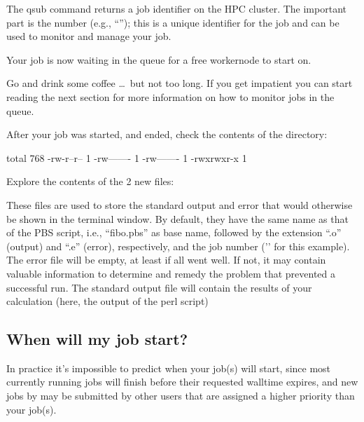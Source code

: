 \begin{prompt}
\end{prompt}

The qsub command returns a job identifier on the HPC cluster. The important
part is the number (e.g., ``\jobnumber''); this is a unique identifier for the job
and can be used to monitor and manage your job.

Your job is now waiting in the queue for a free workernode to start on.

Go and drink some coffee \dots\ but not too long. If you get impatient you can
start reading the next section for more information on how to monitor jobs in the queue.

After your job was started, and ended, check the contents of the directory:

\begin{prompt}
total 768
-rw-r--r-- 1 %
-rw------- 1 %
-rw------- 1 %
-rwxrwxr-x 1 %
\end{prompt}

Explore the contents of the 2 new files:

\begin{prompt}
\end{prompt}

These files are used to store the standard output and error that would
otherwise be shown in the terminal window. By default, they have the same name
as that of the PBS script, i.e., ``fibo.pbs'' as base name, followed by the
extension ``.o'' (output) and ``.e'' (error), respectively, and the job number
('\jobnumber' for this example). The error file will be empty, at least if all went
well. If not, it may contain valuable information to determine and remedy the
problem that prevented a successful run. The standard output file will contain
the results of your calculation (here, the output of the perl script)

\ifgent
\subsection{When will my job start?}
\label{subsec:priority}
In practice it's impossible to predict when your job(s) will start,
since most currently running jobs will finish before their requested walltime
expires, and new jobs by may be submitted by other users that are assigned a higher
priority than your job(s).


